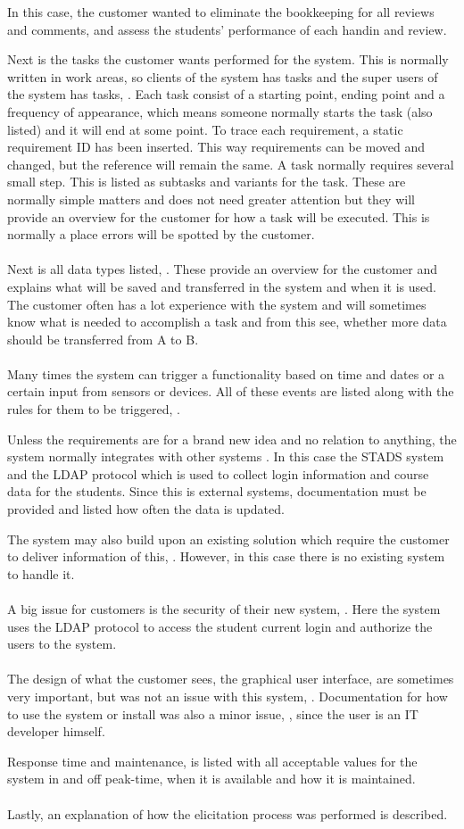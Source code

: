 \documentclass[Main]{subfiles}
\begin{document}
In this case, the customer wanted to eliminate the bookkeeping for all reviews and comments, and assess the students' performance of each handin and review.

Next is the tasks the customer wants performed for the system.
This is normally written in work areas, so clients of the system has tasks and the super users of the system has tasks, \parencite[8-13]{HI4}.
Each task consist of a starting point, ending point and a frequency of appearance, which means someone normally starts the task (also listed) and it will end at some point.
To trace each requirement, a static requirement ID has been inserted.
This way requirements can be moved and changed, but the reference will remain the same.
A task normally requires several small step.
This is listed as subtasks and variants for the task. 
These are normally simple matters and does not need greater attention but they will provide an overview for the customer for how a task will be executed.
This is normally a place errors will be spotted by the customer.
\\
\\
Next is all data types listed, \parencite[14-17]{HI4}.
These provide an overview for the customer and explains what will be saved and transferred in the system and when it is used.
The customer often has a lot experience with the system and will sometimes know what is needed to accomplish a task and from this see, whether more data should be transferred from A to B.
\\
\\
Many times the system can trigger a functionality based on time and dates or a certain input from sensors or devices.
All of these events are listed along with the rules for them to be triggered, \parencite[18]{HI4}.

Unless the requirements are for a brand new idea and no relation to anything, the system normally integrates with other systems \parencite[19-20]{HI4}. 
In this case the STADS system and the LDAP protocol which is used to collect login information and course data for the students. 
Since this is external systems, documentation must be provided and listed how often the data is updated.

The system may also build upon an existing solution which require the customer to deliver information of this, \parencite[21]{HI4}.
However, in this case there is no existing system to handle it.
\\
\\
A big issue for customers is the security of their new system, \parencite[22]{HI4}.
Here the system uses the LDAP protocol to access the student current login and authorize the users to the system.
\\
\\
The design of what the customer sees, the graphical user interface, are sometimes very important, but was not an issue with this system, \parencite[23]{HI4}.
Documentation for how to use the system or install was also a minor issue, \parencite[24]{HI4}, since the user is an IT developer himself.

Response time and maintenance, \parencite[25-27]{HI4} is listed with all acceptable values for the system in and off peak-time, when it is available and how it is maintained.
\\
\\
Lastly, an explanation of how the elicitation process was performed is described.
\end{document}
